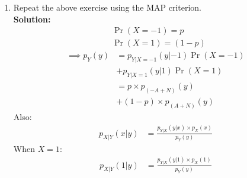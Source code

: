 \documentclass[journal,12pt,twocolumn]{IEEEtran}
\numberwithin{equation}{section}
\renewcommand\thesection{\arabic{section}}
\providecommand{\pr}[1]{\ensuremath{\Pr\left(#1\right)}}
\newcommand{\solution}{\noindent \textbf{\\ Solution: }}
\begin{document}
\begin{enumerate}[label=\thesection.\arabic*
        ,ref=\thesection.\theenumi]
\begin{align}
                  & = p Q_N(A - \delta) + (1-p)Q_N(A + \delta)
          \end{align}
          To maximize $P_e$, differentiate the above equation w.r.t $\delta$ and equate it to $0$:
          \begin{align}
                       & 0  =  \dfrac{p}{\sqrt{2\pi}} e^{-\frac{(\delta - A)^2}{2}} - \dfrac{(1-p)}{\sqrt{2\pi}} e^{-\frac{(A + \delta)^2}{2}} \\
              \implies & pe^{-\frac{(\delta - A)^2}{2}} = (1-p)e^{-\frac{(A + \delta)^2}{2}}
          \end{align}
          Taking $\ln$ on both sides:
          \begin{align}
              \ln{p} - \frac{(\delta - A)^2}{2} & = \ln{(1-p)} - \frac{(\delta + A)^2}{2} \\
              \implies  2A\delta                & = \ln{\frac{1-p}{p}}                    \\
              \implies  \delta                  & = \frac{1}{2A} \ln{\frac{1-p}{p}}
          \end{align}
    \item Repeat the above exercise using the MAP criterion.
          \solution
          \begin{align}
               & \pr{X = -1} = p    \\
               & \pr{X = 1} = (1-p)
          \end{align}
          \begin{align}
              \nonumber  \implies  p_Y(y) & = p_{Y|X = -1}(y|-1) \pr{X = -1} \\
                                          & + p_{Y| X = 1}(y|1) \pr{X = 1}   \\
              \nonumber                   & = p \times p_{(-A + N)}(y)       \\
                                          & + (1-p) \times p_{(A+N)} (y)
          \end{align}
          Also:
          \begin{align}
              p_{X|Y}(x|y) & = \frac{p_{Y|X}(y|x) \times p_X(x)}{p_Y(y)}
          \end{align}
          When $X=1$:
          \begin{align}
              p_{X|Y}(1|y) & = \frac{p_{Y|X}(y|1) \times p_X(1)}{p_Y(y)}                                                                                                                                       \\

\end{align}
\end{enumerate}
\end{document}
